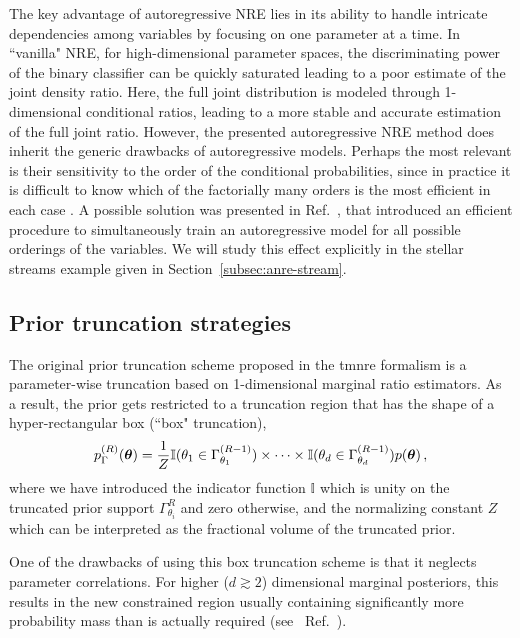 The key advantage of autoregressive NRE lies in its ability to handle intricate dependencies among variables by focusing on one parameter at a time. In ``vanilla" NRE, for high-dimensional parameter spaces, the discriminating power of the binary classifier can be quickly saturated leading to a poor estimate of the joint density ratio. Here, the full joint distribution is modeled through 1-dimensional conditional ratios, leading to a more stable and accurate estimation of the full joint ratio. However, the presented autoregressive NRE method does inherit the generic drawbacks of autoregressive models. Perhaps the most relevant is their sensitivity to the order of the conditional probabilities, since in practice it is difficult to know which of the factorially many orders is the most efficient in each case \cite{Papamakarios:2017tec}. A possible solution was presented in Ref.~\cite{Uria:2013aa}, that introduced an efficient procedure to simultaneously train an autoregressive model for all possible orderings of the variables. We will study this effect explicitly in the stellar streams example given in Section~\ref{subsec:anre-stream}. 


\subsection{Prior truncation strategies}\label{subsec:anre-truncation}

 The original prior truncation scheme proposed in the \gls*{tmnre} formalism \cite{Miller:2021aa} is a parameter-wise truncation based on 1-dimensional marginal ratio estimators. As a result, the prior gets restricted to a truncation region that has the shape of a hyper-rectangular box (``box" truncation), 
\begin{equation} \label{eq:anre-box}
     p^{(R)}_{\Gamma}(\bm{\theta}) = \frac1Z \mathbb{I}(\theta_1 \in \Gamma_{\theta_1}^{(R-1)}) \times \cdots \times\mathbb{I}(\theta_d \in \Gamma_{\theta_d}^{(R-1)}) p(\bm{\theta}) \,,
\end{equation}
where we have introduced the indicator function $\mathbb{I}$ which is unity on the truncated prior support $\Gamma_{\theta_i}^R$ and zero otherwise, and the normalizing constant $Z$ which can be interpreted as the fractional volume of the truncated prior.

One of the drawbacks of using this box truncation scheme is that it neglects parameter correlations. For higher ($d \gtrsim 2$) dimensional marginal posteriors, this results in the new constrained region usually containing significantly more probability mass than is actually required (see \eg~Ref.~\cite{Karchev:2022xyn}).

